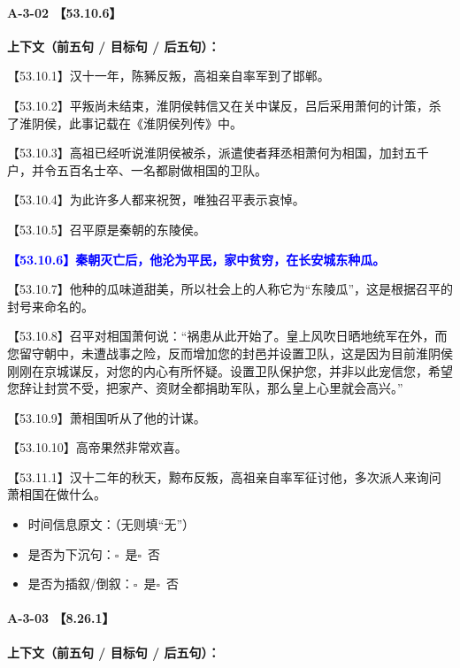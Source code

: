 \documentclass[fontset=none,11pt,a4paper]{ctexart}
\newcommand{\answerline}[1]{\underline{\hspace{#1}}}
\newcommand{\choicebox}[1]{$\square$~#1}
\begin{document}
\paragraph{A-3-02 \quad 【53.10.6】}
\textbf{上下文（前五句 / 目标句 / 后五句）：}

\noindent 【53.10.1】汉十一年，陈豨反叛，高祖亲自率军到了邯郸。\par
\noindent 【53.10.2】平叛尚未结束，淮阴侯韩信又在关中谋反，吕后采用萧何的计策，杀了淮阴侯，此事记载在《淮阴侯列传》中。\par
\noindent 【53.10.3】高祖已经听说淮阴侯被杀，派遣使者拜丞相萧何为相国，加封五千户，并令五百名士卒、一名都尉做相国的卫队。\par
\noindent 【53.10.4】为此许多人都来祝贺，唯独召平表示哀悼。\par
\noindent 【53.10.5】召平原是秦朝的东陵侯。\par
\noindent \textcolor{blue}{\textbf{【53.10.6】秦朝灭亡后，他沦为平民，家中贫穷，在长安城东种瓜。}}\par
\noindent 【53.10.7】他种的瓜味道甜美，所以社会上的人称它为“东陵瓜”，这是根据召平的封号来命名的。\par
\noindent 【53.10.8】召平对相国萧何说：“祸患从此开始了。皇上风吹日晒地统军在外，而您留守朝中，未遭战事之险，反而增加您的封邑并设置卫队，这是因为目前淮阴侯刚刚在京城谋反，对您的内心有所怀疑。设置卫队保护您，并非以此宠信您，希望您辞让封赏不受，把家产、资财全都捐助军队，那么皇上心里就会高兴。”\par
\noindent 【53.10.9】萧相国听从了他的计谋。\par
\noindent 【53.10.10】高帝果然非常欢喜。\par
\noindent 【53.11.1】汉十二年的秋天，黥布反叛，高祖亲自率军征讨他，多次派人来询问萧相国在做什么。\par

\begin{itemize}
  \item 时间信息原文：\answerline{7.5cm}（无则填“无”）
  \item 是否为下沉句：\choicebox{是}\quad \choicebox{否}
  \item 是否为插叙/倒叙：\choicebox{是}\quad \choicebox{否}
\end{itemize}

\paragraph{A-3-03 \quad 【8.26.1】}
\textbf{上下文（前五句 / 目标句 / 后五句）：}
\end{document}
